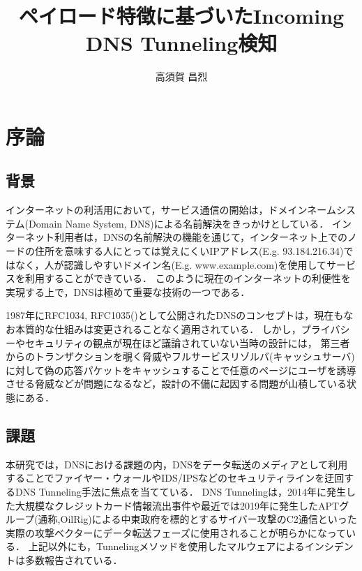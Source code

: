 \documentclass[12pt]{jarticle} %
\title{ペイロード特徴に基づいたIncoming DNS Tunneling検知}
\author{高須賀 昌烈}
\begin{document}
\titlepage
\cmemberspage
\firstabstract
\secondabstract



\toc
\newpage
\listoffigures
\listoftables



\newpage
{}
\section{序論}
\subsection{背景}
インターネットの利活用において，サービス通信の開始は，ドメインネームシステム(Domain Name System, DNS)による名前解決をきっかけとしている．
インターネット利用者は，DNSの名前解決の機能を通じて，インターネット上でのノードの住所を意味する人にとっては覚えにくいIPアドレス(E.g. 93.184.216.34)ではなく，人が認識しやすいドメイン名(E.g. www.example.com)を使用してサービスを利用することができている．
このように現在のインターネットの利便性を実現する上で，DNSは極めて重要な技術の一つである．

1987年にRFC1034, RFC1035(\cite{rfc1034, rfc1035})として公開されたDNSのコンセプトは，現在もなお本質的な仕組みは変更されることなく適用されている．
しかし，プライバシーやセキュリティの観点が現在ほど議論されていない当時の設計には，
第三者からのトランザクションを覗く脅威やフルサービスリゾルバ(キャッシュサーバ)に対して偽の応答パケットをキャッシュすることで任意のページにユーザを誘導させる脅威などが問題になるなど，設計の不備に起因する問題が山積している状態にある．

\subsection{課題}
本研究では，DNSにおける課題の内，DNSをデータ転送のメディアとして利用することでファイヤー・ウォールやIDS/IPSなどのセキュリティラインを迂回するDNS Tunneling手法に焦点を当てている．
DNS Tunnelingは，2014年に発生した大規模なクレジットカード情報流出事件\cite{frameworkpos}や最近では2019年に発生したAPTグループ(通称,OilRig)による中東政府を標的とするサイバー攻撃のC2通信\cite{bondupdater}といった実際の攻撃ベクターにデータ転送フェーズに使用されることが明らかになっている．
上記以外にも，Tunnelingメソッドを使用したマルウェアによるインシデントは多数報告されている\cite{bernhardpos, multigrainpos, pisloader, denis, dnsmessenger, udpos}．
\end{document}
